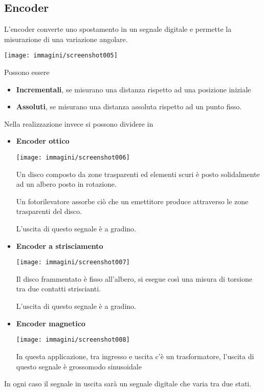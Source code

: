 \documentclass[a4paper, 15pt]{article}
\begin{document}
\subsection{Encoder}
\begin{adjustwidth}{2in}{}
	L'encoder converte uno spostamento in un segnale digitale e permette la misurazione di una variazione angolare. 
	\begin{center}
		\texttt{[image: immagini/screenshot005]}
	\end{center}
	Possono essere 
	\begin{itemize}
		\item \textbf{Incrementali}, se misurano una distanza rispetto ad una posizione iniziale 
		\item \textbf{Assoluti}, se misurano una distanza assoluta rispetto ad un punto fisso.
	\end{itemize}
	Nella realizzazione invece si possono dividere in 
	\begin{itemize}
		\item \textbf{Encoder ottico}
		\begin{center}
			\texttt{[image: immagini/screenshot006]}
		\end{center}
		Un disco composto da zone trasparenti ed elementi scuri è posto solidalmente ad un albero posto in rotazione. 
		
		Un fotorilevatore assorbe ciò che un emettitore produce attraverso le zone trasparenti del disco.
		
		L'uscita di questo segnale è a gradino.
		
		\item \textbf{Encoder a strisciamento}
		\begin{center}
			\texttt{[image: immagini/screenshot007]}
		\end{center}
		Il disco frammentato è fisso all'albero, si esegue così una misura di torsione tra due contatti striscianti.
		
		L'uscita di questo segnale è a gradino.
\newpage		
		\item \textbf{Encoder magnetico}
		 \begin{center}
		 	\texttt{[image: immagini/screenshot008]}
		 \end{center}
		 In questa applicazione, tra ingresso e uscita c'è un trasformatore, l'uscita di questo segnale è grossomodo sinusoidale
	\end{itemize}
	In ogni caso il segnale in uscita sarà un segnale digitale che varia tra due stati. 
\end{adjustwidth}
\end{document}
